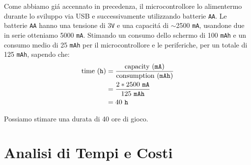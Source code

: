 \documentclass[a4paper]{article}
\begin{document}
Come abbiamo gi\'a accennato in precedenza, il microcontrollore lo alimentermo durante lo sviluppo via USB e successivamente utilizzando batterie \texttt{AA}. Le batterie \texttt{AA} hanno una tensione di 3\texttt{V} e una capacit\'a di $\sim$2500 \texttt{mA}, usandone due in serie otteniamo 5000 \texttt{mA}. 
Stimando un consumo dello schermo di 100 \texttt{mAh} e un consumo medio di 25 \texttt{mAh} per il microcontrollore e le periferiche, per un totale di 125 \texttt{mAh}, sapendo che:
\begin{equation*}
    \begin{aligned}
        \textmd{time} \ (\texttt{h}) & = \frac{\textmd{capacity} \ (\texttt{mA})}{\textmd{consumption} \ (\texttt{mAh})}\\
                                     & = \frac{2 * 2500 \ \texttt{mA}}{125 \ \texttt{mAh}}\\ 
                                     & = 40 \ \texttt{h}
    \end{aligned}
\end{equation*}

Possiamo stimare una durata di 40 ore di gioco.

\section{Analisi di Tempi e Costi}
\end{document}
